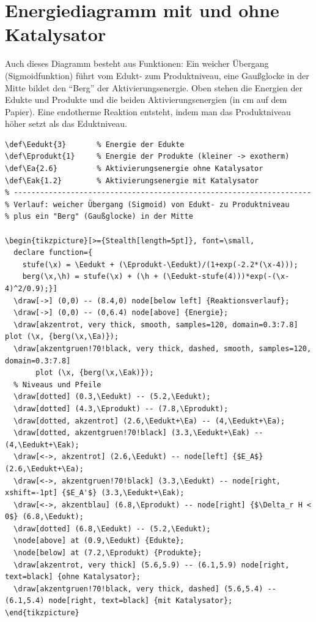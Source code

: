 \section{Energiediagramm mit und ohne Katalysator}

Auch dieses Diagramm besteht aus Funktionen: Ein weicher Übergang (Sigmoidfunktion) führt vom Edukt- zum Produktniveau, eine Gaußglocke in der Mitte bildet den \enquote{Berg} der Aktivierungsenergie. Oben stehen die Energien der Edukte und Produkte und die beiden Aktivierungsenergien (in cm auf dem Papier). Eine endotherme Reaktion entsteht, indem man das Produktniveau höher setzt als das Eduktniveau.

\begin{lstlisting}[style=latex]
% ---- Werte (in cm auf dem Papier) ---------------------------------
\def\Eedukt{3}       % Energie der Edukte
\def\Eprodukt{1}     % Energie der Produkte (kleiner -> exotherm)
\def\Ea{2.6}         % Aktivierungsenergie ohne Katalysator
\def\Eak{1.2}        % Aktivierungsenergie mit Katalysator
% --------------------------------------------------------------------
% Verlauf: weicher Übergang (Sigmoid) von Edukt- zu Produktniveau
% plus ein "Berg" (Gaußglocke) in der Mitte

\begin{tikzpicture}[>={Stealth[length=5pt]}, font=\small,
  declare function={
    stufe(\x) = \Eedukt + (\Eprodukt-\Eedukt)/(1+exp(-2.2*(\x-4)));
    berg(\x,\h) = stufe(\x) + (\h + (\Eedukt-stufe(4)))*exp(-(\x-4)^2/0.9);}]
  \draw[->] (0,0) -- (8.4,0) node[below left] {Reaktionsverlauf};
  \draw[->] (0,0) -- (0,6.4) node[above] {Energie};
  \draw[akzentrot, very thick, smooth, samples=120, domain=0.3:7.8] plot (\x, {berg(\x,\Ea)});
  \draw[akzentgruen!70!black, very thick, dashed, smooth, samples=120, domain=0.3:7.8]
       plot (\x, {berg(\x,\Eak)});
  % Niveaus und Pfeile
  \draw[dotted] (0.3,\Eedukt) -- (5.2,\Eedukt);
  \draw[dotted] (4.3,\Eprodukt) -- (7.8,\Eprodukt);
  \draw[dotted, akzentrot] (2.6,\Eedukt+\Ea) -- (4,\Eedukt+\Ea);
  \draw[dotted, akzentgruen!70!black] (3.3,\Eedukt+\Eak) -- (4,\Eedukt+\Eak);
  \draw[<->, akzentrot] (2.6,\Eedukt) -- node[left] {$E_A$} (2.6,\Eedukt+\Ea);
  \draw[<->, akzentgruen!70!black] (3.3,\Eedukt) -- node[right, xshift=-1pt] {$E_A'$} (3.3,\Eedukt+\Eak);
  \draw[<->, akzentblau] (6.8,\Eprodukt) -- node[right] {$\Delta_r H < 0$} (6.8,\Eedukt);
  \draw[dotted] (6.8,\Eedukt) -- (5.2,\Eedukt);
  \node[above] at (0.9,\Eedukt) {Edukte};
  \node[below] at (7.2,\Eprodukt) {Produkte};
  \draw[akzentrot, very thick] (5.6,5.9) -- (6.1,5.9) node[right, text=black] {ohne Katalysator};
  \draw[akzentgruen!70!black, very thick, dashed] (5.6,5.4) -- (6.1,5.4) node[right, text=black] {mit Katalysator};
\end{tikzpicture}
\end{lstlisting}

